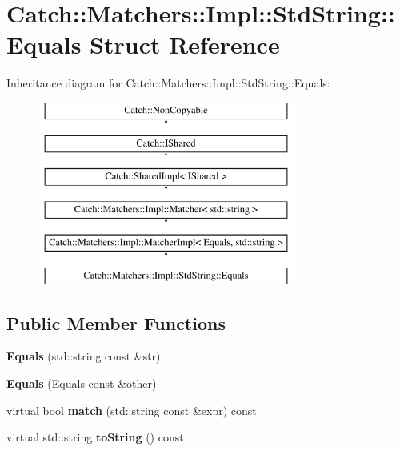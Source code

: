 \hypertarget{struct_catch_1_1_matchers_1_1_impl_1_1_std_string_1_1_equals}{\section{Catch\-:\-:Matchers\-:\-:Impl\-:\-:Std\-String\-:\-:Equals Struct Reference}
\label{struct_catch_1_1_matchers_1_1_impl_1_1_std_string_1_1_equals}
}
Inheritance diagram for Catch\-:\-:Matchers\-:\-:Impl\-:\-:Std\-String\-:\-:Equals\-:\begin{figure}[H]
\begin{center}
\leavevmode
\includegraphics[height=6.000000cm]{struct_catch_1_1_matchers_1_1_impl_1_1_std_string_1_1_equals}
\end{center}
\end{figure}
\subsection*{Public Member Functions}
\begin{DoxyCompactItemize}
\item 
\hypertarget{struct_catch_1_1_matchers_1_1_impl_1_1_std_string_1_1_equals_a1bd99b381c6116a02b1e3ca200ca920c}{{\bfseries Equals} (std\-::string const \&str)}\label{struct_catch_1_1_matchers_1_1_impl_1_1_std_string_1_1_equals_a1bd99b381c6116a02b1e3ca200ca920c}

\item 
\hypertarget{struct_catch_1_1_matchers_1_1_impl_1_1_std_string_1_1_equals_acaa97de06aedf363ae803d65a975f5e4}{{\bfseries Equals} (\hyperlink{struct_catch_1_1_matchers_1_1_impl_1_1_std_string_1_1_equals}{Equals} const \&other)}\label{struct_catch_1_1_matchers_1_1_impl_1_1_std_string_1_1_equals_acaa97de06aedf363ae803d65a975f5e4}

\item 
\hypertarget{struct_catch_1_1_matchers_1_1_impl_1_1_std_string_1_1_equals_a00c8259a76c24da669e116662ededc70}{virtual bool {\bfseries match} (std\-::string const \&expr) const }\label{struct_catch_1_1_matchers_1_1_impl_1_1_std_string_1_1_equals_a00c8259a76c24da669e116662ededc70}

\item 
\hypertarget{struct_catch_1_1_matchers_1_1_impl_1_1_std_string_1_1_equals_a7a09449ff2f858981caf3b1f6c36d270}{virtual std\-::string {\bfseries to\-String} () const }\label{struct_catch_1_1_matchers_1_1_impl_1_1_std_string_1_1_equals_a7a09449ff2f858981caf3b1f6c36d270}

\end{DoxyCompactItemize}
